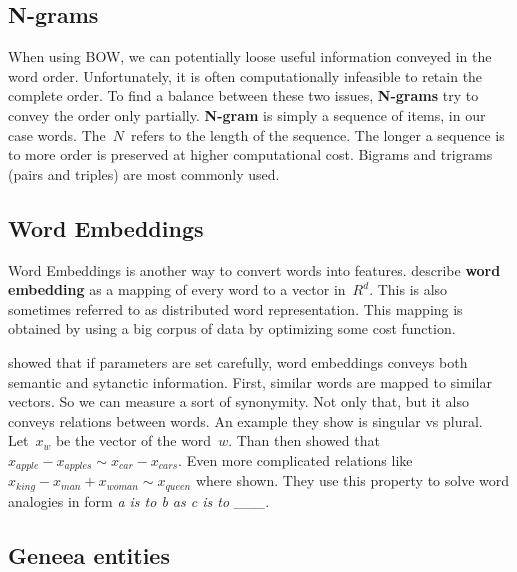 

\subsection{N-grams}

When using BOW, we can potentially loose useful information conveyed in the word order.
Unfortunately, it is often computationally infeasible to retain the complete order.
To find a balance between these two issues, {\bf N-grams} try to convey the order only partially.
{\bf N-gram} is simply a sequence of items, in our case words. The~$N$~refers to the length of the sequence.
The longer a sequence is to more order is preserved at higher computational cost.
Bigrams and trigrams (pairs and triples) are most commonly used.


\subsection{Word Embeddings}

Word Embeddings is another way to convert words into features.
\citet{LeGo14} describe {\bf word embedding} as a mapping of every word to a vector in~$R^d$.
This is also sometimes referred to as distributed word representation.
This mapping is obtained by using a big corpus of data by optimizing some cost function.

\citet{Mik13} showed that if parameters are set carefully, word embeddings conveys both semantic and sytanctic information.
First, similar words are mapped to similar vectors. So we can measure a sort of synonymity.
Not only that, but it also conveys relations between words.
An example they show is singular vs plural. Let~$x_{w}$ be the vector of the word~$w$.
Than then showed that $x_{apple}-x_{apples} \sim x_{car}-x_{cars}$.
Even more complicated relations like $x_{king} - x_{man} + x_{woman} \sim x_{queen}$ where shown.
They use this property to solve word analogies in form {\it a is to b as c is to \_\_\_}.


\subsection{Geneea entities}

